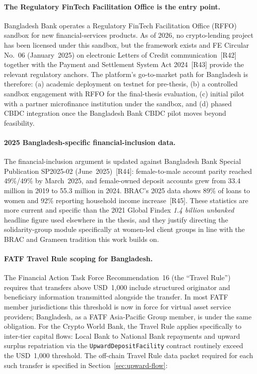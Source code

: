 \documentclass[12pt,a4paper]{report}
\begin{document}
\paragraph{The Regulatory FinTech Facilitation Office is the entry point.}
Bangladesh Bank operates a Regulatory FinTech Facilitation Office (RFFO) sandbox for new financial-services products. As of 2026, no crypto-lending project has been licensed under this sandbox, but the framework exists and FE Circular No.~06 (January~2025) on electronic Letters of Credit communication~[R42] together with the Payment and Settlement System Act 2024~[R43] provide the relevant regulatory anchors. The platform's go-to-market path for Bangladesh is therefore: (a) academic deployment on testnet for pre-thesis, (b) a controlled sandbox engagement with RFFO for the final-thesis evaluation, (c) initial pilot with a partner microfinance institution under the sandbox, and (d) phased CBDC integration once the Bangladesh Bank CBDC pilot moves beyond feasibility.

\paragraph{2025 Bangladesh-specific financial-inclusion data.}
The financial-inclusion argument is updated against Bangladesh Bank Special Publication SP2025-02 (June~2025)~[R44]: female-to-male account parity reached 49\%/49\% by March~2025, and female-owned deposit accounts grew from 33.4 million in 2019 to 55.3 million in 2024. BRAC's 2025 data shows 89\% of loans to women and 92\% reporting household income increase~[R45]. These statistics are more current and specific than the 2021 Global Findex \emph{1.4 billion unbanked} headline figure used elsewhere in the thesis, and they justify directing the solidarity-group module specifically at women-led client groups in line with the BRAC and Grameen tradition this work builds on.

\paragraph{FATF Travel Rule scoping for Bangladesh.}
The Financial Action Task Force Recommendation~16 (the ``Travel Rule'') requires that transfers above USD~1{,}000 include structured originator and beneficiary information transmitted alongside the transfer. In most FATF member jurisdictions this threshold is now in force for virtual asset service providers; Bangladesh, as a FATF Asia-Pacific Group member, is under the same obligation. For the Crypto World Bank, the Travel Rule applies specifically to inter-tier capital flows: Local Bank to National Bank repayments and upward surplus repatriation via the \texttt{UpwardDepositFacility} contract routinely exceed the USD~1{,}000 threshold. The off-chain Travel Rule data packet required for each such transfer is specified in Section~\ref{sec:upward-flow}:
\end{document}
